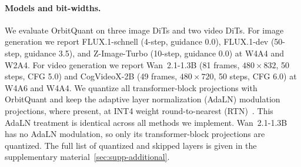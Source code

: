 
\paragraph{Models and bit-widths.}
We evaluate OrbitQuant on three image DiTs and two video DiTs. For image generation we report FLUX.1-schnell (4-step, guidance 0.0), FLUX.1-dev (50-step, guidance 3.5), and Z-Image-Turbo (10-step, guidance 0.0) at W4A4 and W2A4. For video generation we report Wan~2.1-1.3B (81 frames, $480{\times}832$, 50 steps, CFG 5.0) and CogVideoX-2B (49 frames, $480{\times}720$, 50 steps, CFG 6.0) at W4A6 and W4A4. We quantize all transformer-block projections with OrbitQuant and keep the adaptive layer normalization (AdaLN) modulation projections, where present, at INT4 weight round-to-nearest (RTN)~\cite{li2024svdquant}. This AdaLN treatment is identical across all methods we implement. Wan~2.1-1.3B has no AdaLN modulation, so only its transformer-block projections are quantized. The full list of quantized and skipped layers is given in the supplementary material~\ref{sec:supp-additional}.


